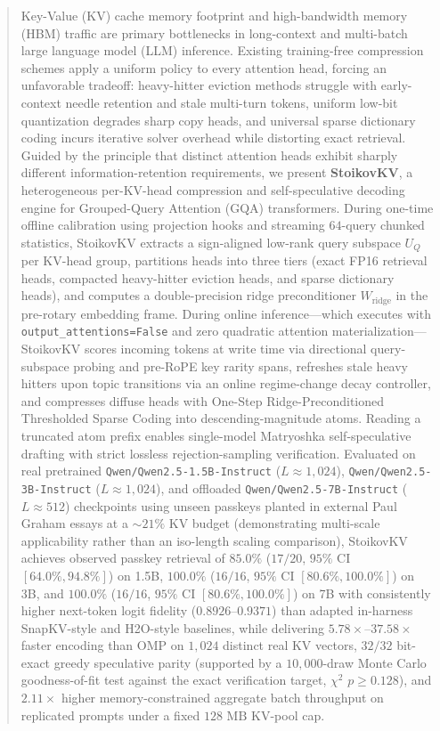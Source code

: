 \documentclass[conference]{IEEEtran}
\begin{document}
\begin{abstract}
Key-Value (KV) cache memory footprint and high-bandwidth memory (HBM) traffic are primary bottlenecks in long-context and multi-batch large language model (LLM) inference. Existing training-free compression schemes apply a uniform policy to every attention head, forcing an unfavorable tradeoff: heavy-hitter eviction methods struggle with early-context needle retention and stale multi-turn tokens, uniform low-bit quantization degrades sharp copy heads, and universal sparse dictionary coding incurs iterative solver overhead while distorting exact retrieval. Guided by the principle that distinct attention heads exhibit sharply different information-retention requirements, we present \textbf{StoikovKV}, a heterogeneous per-KV-head compression and self-speculative decoding engine for Grouped-Query Attention (GQA) transformers. During one-time offline calibration using projection hooks and streaming $64$-query chunked statistics, StoikovKV extracts a sign-aligned low-rank query subspace $U_Q$ per KV-head group, partitions heads into three tiers (exact FP16 retrieval heads, compacted heavy-hitter eviction heads, and sparse dictionary heads), and computes a double-precision ridge preconditioner $W_{\text{ridge}}$ in the pre-rotary embedding frame. During online inference---which executes with \texttt{output\_attentions=False} and zero quadratic attention materialization---StoikovKV scores incoming tokens at write time via directional query-subspace probing and pre-RoPE key rarity spans, refreshes stale heavy hitters upon topic transitions via an online regime-change decay controller, and compresses diffuse heads with One-Step Ridge-Preconditioned Thresholded Sparse Coding into descending-magnitude atoms. Reading a truncated atom prefix enables single-model Matryoshka self-speculative drafting with strict lossless rejection-sampling verification. Evaluated on real pretrained \texttt{Qwen/Qwen2.5-1.5B-Instruct} ($L \approx 1{,}024$), \texttt{Qwen/Qwen2.5-3B-Instruct} ($L \approx 1{,}024$), and offloaded \texttt{Qwen/Qwen2.5-7B-Instruct} ($L \approx 512$) checkpoints using unseen passkeys planted in external Paul Graham essays at a $\sim 21\%$ KV budget (demonstrating multi-scale applicability rather than an iso-length scaling comparison), StoikovKV achieves observed passkey retrieval of $85.0\%$ ($17/20$, $95\%$ CI $[64.0\%, 94.8\%]$) on 1.5B, $100.0\%$ ($16/16$, $95\%$ CI $[80.6\%, 100.0\%]$) on 3B, and $100.0\%$ ($16/16$, $95\%$ CI $[80.6\%, 100.0\%]$) on 7B with consistently higher next-token logit fidelity ($0.8926$--$0.9371$) than adapted in-harness SnapKV-style and H2O-style baselines, while delivering $5.78\times$--$37.58\times$ faster encoding than OMP on $1{,}024$ distinct real KV vectors, $32/32$ bit-exact greedy speculative parity (supported by a $10{,}000$-draw Monte Carlo goodness-of-fit test against the exact verification target, $\chi^2$ $p \ge 0.128$), and $2.11\times$ higher memory-constrained aggregate batch throughput on replicated prompts under a fixed $128\text{ MB}$ KV-pool cap.
\end{abstract}
\end{document}
